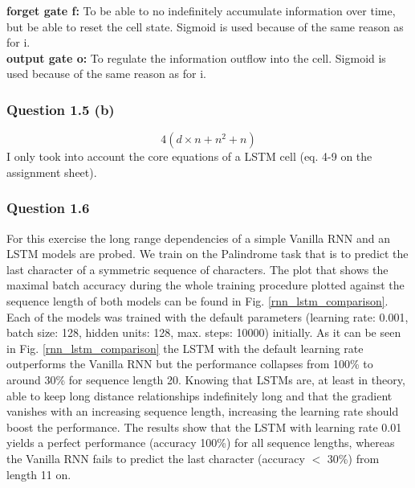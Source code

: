 \documentclass{article}
\begin{document}
\textbf{forget gate f:} To be able to no indefinitely accumulate information over time, but be able to reset the cell state. Sigmoid is used because of the same reason as for i. \\

\textbf{output gate o:} To regulate the information outflow into the cell. Sigmoid is used because of the same reason as for i. \\
\subsubsection*{Question 1.5 (b)}
\begin{equation}
	4(d \times n + n^2 + n)
\end{equation}
I only took into account the core equations of a LSTM cell (eq. 4-9 on the assignment sheet).
\subsubsection*{Question 1.6}
For this exercise the long range dependencies of a simple Vanilla RNN and an LSTM models are probed.  We train on the Palindrome task that is to predict the last character of a symmetric sequence of characters.
The plot that shows the maximal batch accuracy during the whole training procedure plotted against the sequence length of both models can be found in Fig. \ref{rnn_lstm_comparison}. Each of the models was trained with the default parameters (learning rate: 0.001, batch size: 128, hidden units: 128, max. steps: 10000) initially. As it can be seen in Fig. \ref{rnn_lstm_comparison} the LSTM with the default learning rate outperforms the Vanilla RNN but the performance collapses from 100\% to around 30\% for sequence length 20. Knowing that LSTMs are, at least in theory, able to keep long distance relationships indefinitely long and that the gradient vanishes with an increasing sequence length, increasing the learning rate should boost the performance. The results show that the LSTM with learning rate 0.01 yields a perfect performance (accuracy 100\%) for all sequence lengths, whereas the Vanilla RNN fails to predict the last character (accuracy $<$ 30\%) from length 11 on.
\end{document}
